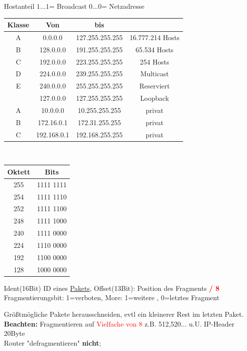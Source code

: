  Hostanteil $1\dots1$= Broadcast  $0\dots0$= Netzadresse \\
\begin{tabular}{|c|c|c|c|}	
\hline
Klasse & Von & bis &  \\
\hline
A 	& 0.0.0.0 	& 127.255.255.255 & 16.777.214 Hosts	\\
\hline
B	& 128.0.0.0 & 191.255.255.255 & 65.534 Hosts		\\
\hline
C	& 192.0.0.0 & 223.255.255.255 & 254	Hosts	\\
\hline
D	& 224.0.0.0 & 239.255.255.255 & Multicast 	\\
\hline
E	& 240.0.0.0	& 255.255.255.255 & Reserviert 	\\
\hline	
 & 127.0.0.0 & 127.255.255.255 & Loopback 	\\
 \hline
A & 10.0.0.0 & 10.255.255.255 & privat 	\\
 \hline
B & 172.16.0.1 & 172.31.255.255& privat  	\\
 \hline
C & 192.168.0.1 & 192.168.255.255 & privat  	\\
 \hline
\end{tabular}~~~~
\begin{tabular}{|c|c|}
\hline
Oktett & Bits \\ \hline
255 & 1111 1111 \\ \hline
254 & 1111 1110 \\ \hline
252 & 1111 1100 \\ \hline
248 & 1111 1000 \\ \hline
240 & 1111 0000 \\ \hline
224 & 1110 0000 \\ \hline
192 & 1100 0000 \\ \hline
128 & 1000 0000 \\ \hline
\end{tabular}

Ident(16Bit) ID eines \underline{Pakets}, Offset(13Bit): Position des Fragments \textbf{\textcolor{red}{/ 8}}	\\
Fragmentierungsbit: 1=verboten, More: 1=weitere , 0=letztes Fragment	

Größtmögliche Pakete herausschneiden, evtl ein kleinerer Rest im letzten Paket.\\
\textbf{Beachten:} Fragmentieren auf \textcolor{red}{Vielfache von 8} z.B. 512,520... u.U. IP-Header 20Byte \\
Router "defragmentieren" \textbf{nicht}; 
